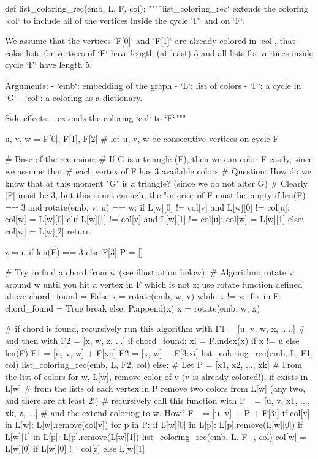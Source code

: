 \begin{sageCell}
def list_coloring_rec(emb, L, F, col):
    """`list_coloring_rec` extends the coloring `col` to include all
    of the vertices inside the cycle `F` and on `F`.

    We assume that the vertices `F[0]` and `F[1]` are already
    colored in `col`, that color lists for vertices of `F` have length (at least) 3 and all lists for vertices
    inside cycle `F` have length 5.

    Arguments:
        - `emb`: embedding of the graph
        - `L`: list of colors
        - `F`: a cycle in `G`
        - `col`: a coloring as a dictionary.

    Side effects:
        - extends the coloring `col` to `F`."""

    u, v, w = F[0], F[1], F[2]  # let u, v, w be consecutive vertices on cycle F

    # Base of the recursion:
    # If G is a triangle (F), then we can color F easily, since we assume that
    # each vertex of F has 3 available colors
    # Question: How do we know that at this moment "G" is a triangle? (since we do not alter G)
    # Clearly |F| must be 3, but this is not enough, the "interior of F must be empty
    if len(F) == 3 and rotate(emb, v, u) == w:
        if L[w][0] != col[v] and L[w][0] != col[u]:
            col[w] = L[w][0]
        elif L[w][1] != col[v] and L[w][1] != col[u]:
            col[w] = L[w][1]
        else:
            col[w] = L[w][2]
        return

    z = u if len(F) == 3 else F[3]
    P = []

    # Try to find a chord from w (see illustration below):
    # Algorithm: rotate v around w until you hit a vertex in F which is not z; use rotate function defined above
    chord_found = False
    x = rotate(emb, w, v)
    while x != z:
        if x in F:
            chord_found = True
            break
        else:
            P.append(x)
        x = rotate(emb, w, x)

    # if chord is found, recursively run this algorithm with F1 = [u, v, w, x, .....]
    # and then with F2 = [x, w, z, ...]
    if chord_found:
        xi = F.index(x) if x != u else len(F)
        F1 = [u, v, w] + F[xi:]
        F2 = [x, w] + F[3:xi]
        list_coloring_rec(emb, L, F1, col)
        list_coloring_rec(emb, L, F2, col)
    else:
        # Let P = [x1, x2, ..., xk]
        # From the list of colors for w, L[w], remove color of v (v is already colored!), if exists in L[w]
        # from the lists of each vertex in P remove two colors from L[w] (any two, and there are at least 2!)
        # recursively call this function with F_ = [u, v, x1, ..., xk, z, ...]
        # and the extend coloring to w. How?
        F_ = [u, v] + P + F[3:]
        if col[v] in L[w]:
            L[w].remove(col[v])
        for p in P:
            if L[w][0] in L[p]:
                L[p].remove(L[w][0])
            if L[w][1] in L[p]:
                L[p].remove(L[w][1])
        list_coloring_rec(emb, L, F_, col)
        col[w] = L[w][0] if L[w][0] != col[z] else L[w][1]
\end{sageCell}

